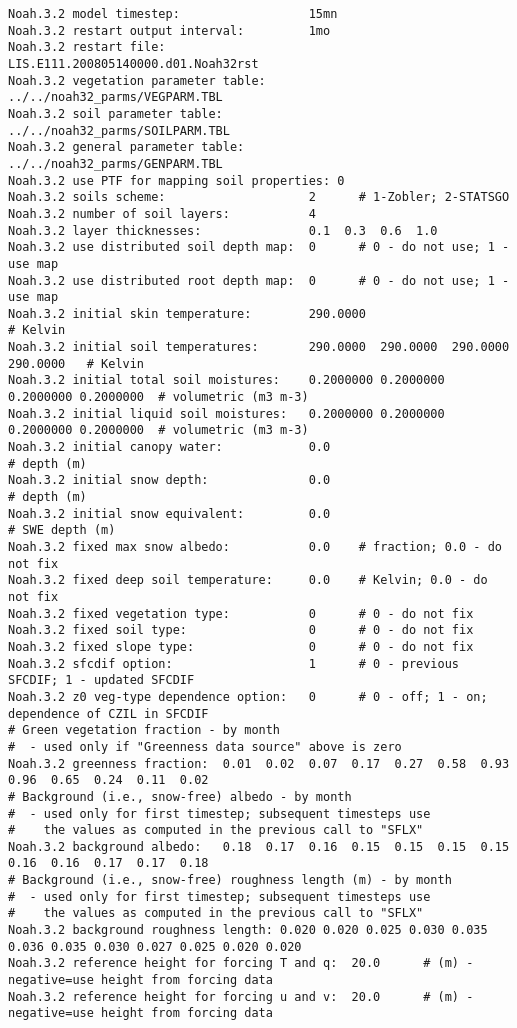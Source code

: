  \begin{Verbatim}[frame=single]
Noah.3.2 model timestep:                  15mn
Noah.3.2 restart output interval:         1mo
Noah.3.2 restart file:                    LIS.E111.200805140000.d01.Noah32rst
Noah.3.2 vegetation parameter table:      ../../noah32_parms/VEGPARM.TBL
Noah.3.2 soil parameter table:            ../../noah32_parms/SOILPARM.TBL
Noah.3.2 general parameter table:         ../../noah32_parms/GENPARM.TBL
Noah.3.2 use PTF for mapping soil properties: 0
Noah.3.2 soils scheme:                    2      # 1-Zobler; 2-STATSGO
Noah.3.2 number of soil layers:           4
Noah.3.2 layer thicknesses:               0.1  0.3  0.6  1.0
Noah.3.2 use distributed soil depth map:  0      # 0 - do not use; 1 - use map
Noah.3.2 use distributed root depth map:  0      # 0 - do not use; 1 - use map
Noah.3.2 initial skin temperature:        290.0000                                 # Kelvin
Noah.3.2 initial soil temperatures:       290.0000  290.0000  290.0000  290.0000   # Kelvin
Noah.3.2 initial total soil moistures:    0.2000000 0.2000000 0.2000000 0.2000000  # volumetric (m3 m-3)
Noah.3.2 initial liquid soil moistures:   0.2000000 0.2000000 0.2000000 0.2000000  # volumetric (m3 m-3)
Noah.3.2 initial canopy water:            0.0                                      # depth (m)
Noah.3.2 initial snow depth:              0.0                                      # depth (m)
Noah.3.2 initial snow equivalent:         0.0                                      # SWE depth (m)
Noah.3.2 fixed max snow albedo:           0.0    # fraction; 0.0 - do not fix
Noah.3.2 fixed deep soil temperature:     0.0    # Kelvin; 0.0 - do not fix
Noah.3.2 fixed vegetation type:           0      # 0 - do not fix
Noah.3.2 fixed soil type:                 0      # 0 - do not fix
Noah.3.2 fixed slope type:                0      # 0 - do not fix
Noah.3.2 sfcdif option:                   1      # 0 - previous SFCDIF; 1 - updated SFCDIF
Noah.3.2 z0 veg-type dependence option:   0      # 0 - off; 1 - on; dependence of CZIL in SFCDIF
# Green vegetation fraction - by month
#  - used only if "Greenness data source" above is zero
Noah.3.2 greenness fraction:  0.01  0.02  0.07  0.17  0.27  0.58  0.93  0.96  0.65  0.24  0.11  0.02
# Background (i.e., snow-free) albedo - by month
#  - used only for first timestep; subsequent timesteps use
#    the values as computed in the previous call to "SFLX"
Noah.3.2 background albedo:   0.18  0.17  0.16  0.15  0.15  0.15  0.15  0.16  0.16  0.17  0.17  0.18
# Background (i.e., snow-free) roughness length (m) - by month
#  - used only for first timestep; subsequent timesteps use
#    the values as computed in the previous call to "SFLX"
Noah.3.2 background roughness length: 0.020 0.020 0.025 0.030 0.035 0.036 0.035 0.030 0.027 0.025 0.020 0.020
Noah.3.2 reference height for forcing T and q:  20.0      # (m) - negative=use height from forcing data
Noah.3.2 reference height for forcing u and v:  20.0      # (m) - negative=use height from forcing data
 \end{Verbatim}

